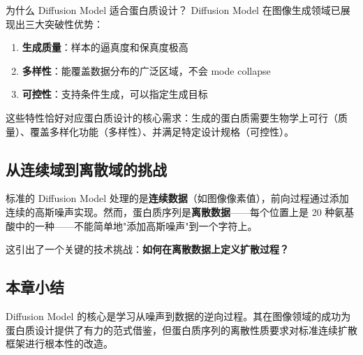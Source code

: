 \begin{importantbox}{为什么 Diffusion Model 适合蛋白质设计？}
Diffusion Model 在图像生成领域已展现出三大突破性优势：
\begin{enumerate}
    \item \textbf{生成质量}：样本的逼真度和保真度极高
    \item \textbf{多样性}：能覆盖数据分布的广泛区域，不会 mode collapse
    \item \textbf{可控性}：支持条件生成，可以指定生成目标
\end{enumerate}
这些特性恰好对应蛋白质设计的核心需求：生成的蛋白质需要生物学上可行（质量）、覆盖多样化功能（多样性）、并满足特定设计规格（可控性）。
\end{importantbox}

\subsection{从连续域到离散域的挑战}

标准的 Diffusion Model 处理的是\textbf{连续数据}（如图像像素值），前向过程通过添加连续的高斯噪声实现。然而，蛋白质序列是\textbf{离散数据}——每个位置上是 20 种氨基酸中的一种——不能简单地"添加高斯噪声"到一个字符上。

这引出了一个关键的技术挑战：\textbf{如何在离散数据上定义扩散过程？}

\subsection{本章小结}

Diffusion Model 的核心是学习从噪声到数据的逆向过程。其在图像领域的成功为蛋白质设计提供了有力的范式借鉴，但蛋白质序列的离散性质要求对标准连续扩散框架进行根本性的改造。


